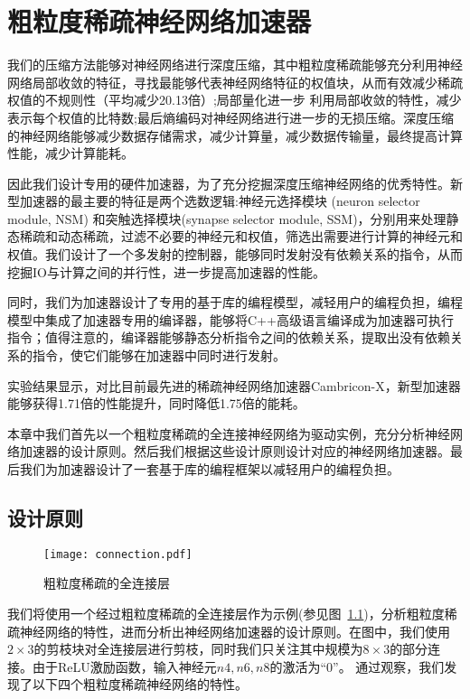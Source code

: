 \chapter{粗粒度稀疏神经网络加速器}

我们的压缩方法能够对神经网络进行深度压缩，其中粗粒度稀疏能够充分利用神经网络局部收敛的特征，寻找最能够代表神经网络特征的权值块，从而有效减少稀疏权值的不规则性（平均减少20.13倍）;局部量化进一步
利用局部收敛的特性，减少表示每个权值的比特数;最后熵编码对神经网络进行进一步的无损压缩。深度压缩的神经网络能够减少数据存储需求，减少计算量，减少数据传输量，最终提高计算性能，减少计算能耗。

因此我们设计专用的硬件加速器，为了充分挖掘深度压缩神经网络的优秀特性。新型加速器的最主要的特征是两个选数逻辑:神经元选择模块 (neuron selector module, NSM) 和突触选择模块(synapse selector module, SSM)，分别用来处理静态稀疏和动态稀疏，过滤不必要的神经元和权值，筛选出需要进行计算的神经元和权值。我们设计了一个多发射的控制器，能够同时发射没有依赖关系的指令，从而挖掘IO与计算之间的并行性，进一步提高加速器的性能。

同时，我们为加速器设计了专用的基于库的编程模型，减轻用户的编程负担，编程模型中集成了加速器专用的编译器，能够将C++高级语言编译成为加速器可执行指令；值得注意的，编译器能够静态分析指令之间的依赖关系，提取出没有依赖关系的指令，使它们能够在加速器中同时进行发射。

实验结果显示，对比目前最先进的稀疏神经网络加速器Cambricon-X，新型加速器能够获得1.71倍的性能提升，同时降低1.75倍的能耗。

本章中我们首先以一个粗粒度稀疏的全连接神经网络为驱动实例，充分分析神经网络加速器的设计原则。然后我们根据这些设计原则设计对应的神经网络加速器。最后我们为加速器设计了一套基于库的编程框架以减轻用户的编程负担。

\section{设计原则}
\label{sec:principle}

\begin{figure}[ht]
\centering
\texttt{[image: connection.pdf]}
\caption{粗粒度稀疏的全连接层}
\label{fig:connection}
\end{figure}

我们将使用一个经过粗粒度稀疏的全连接层作为示例(参见图~\ref{fig:connection})，分析粗粒度稀疏神经网络的特性，进而分析出神经网络加速器的设计原则。在图中，我们使用$2\times 3$的剪枝块对全连接层进行剪枝，同时我们只关注其中规模为$8\times 3$的部分连接。由于ReLU激励函数，输入神经元$n4, n6, n8$的激活为“0”。
通过观察，我们发现了以下四个粗粒度稀疏神经网络的特性。


